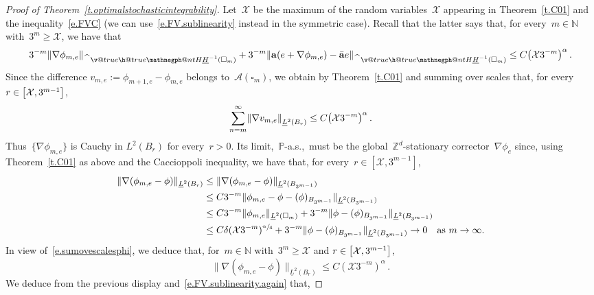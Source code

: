 \documentclass[11pt]{article} %
\makeatletter
\let\oldsquare\square %
\renewcommand{\square}{\oldsquare}
\numberwithin{equation}{section}
\theoremstyle{definition}
\let\originalleft\left
\let\originalright\right
\renewcommand{\left}{\mathopen{}\mathclose\bgroup\originalleft}
\renewcommand{\right}{\aftergroup\egroup\originalright}
\newcommand*{\N}{\ensuremath{\mathbb{N}}}
\newcommand*{\Zd}{\ensuremath{\mathbb{Z}^d}}
\renewcommand*{\hat}{\widehat}
\renewcommand{\a}{\mathbf{a}}
\newcommand{\ahom}{\bar{\a}}
\newcommand{\cu}{\square}
\renewcommand{\P}{\mathbb{P}}
\newcommand{\X}{\mathcal{X}}
\newcommand{\negphantom}{\v@true\h@true\negph@nt}
\newcommand{\negph@nt}{\ifmmode\expandafter\mathpalette 
  \expandafter\mathnegph@nt\else\expandafter\makenegph@nt\fi}
\newcommand{\makenegph@nt}[1]{%
  \setbox\z@\hbox{\color@begingroup#1\color@endgroup}\finnegph@nt}
\newcommand{\finnegph@nt}{%
  \setbox\tw@\null 
  \ifv@ \ht\tw@\ht\z@\dp\tw@\dp\z@\fi \ifh@\wd\tw@-\wd\z@\fi\box\tw@}
\newcommand{\mathnegph@nt}[2]{%
  \setbox\z@\hbox{$\m@th #1{#2}$}\finnegph@nt}
\newcommand{\Hminusul}{\hat{\phantom{H}}\negphantom{H}\underline{H}^{-1}}
\newcommand{\A}{\mathcal{A}}
\makeatother
\begin{document}
\begin{proof}[Proof of Theorem~\ref{t.optimalstochasticintegrability}]
Let~$\X$ be the maximum of the random variables~$\X$ appearing in Theorem~\ref{t.C01} and the inequality~\eqref{e.FVC} (we can use~\eqref{e.FV.sublinearity} instead in the symmetric case). 
Recall that the latter says that, for every~$m\in\N$ with~$3^m\geq \X$, we have that 
\begin{equation}
\label{e.FV.sublinearity.again}
3^{-m} \| \nabla \phi_{m,e} \|_{\Hminusul(\cu_m)} 
+
3^{-m} \| \a (e+ \nabla \phi_{m,e}) -\ahom e  \|_{\Hminusul(\cu_m)} 
\leq 
C  \bigl( \X 3^{-m} \bigr)^{\alpha}
\,.
\end{equation}
Since the difference $v_{m,e} := \phi_{m+1,e}-\phi_{m,e}$ belongs to~$\A(\cu_m)$, we obtain by Theorem~\ref{t.C01} and summing over scales that, for every $r \in \left[\X , 3^{m-1} \right]$, 
\begin{equation}
\label{e.sumovescalesphi}
\sum_{n = m}^\infty \left\| \nabla v_{m,e} \right\|_{\underline{L}^2(B_{r})} 
\leq
C \bigl( \X 3^{-m} \bigr)^{\alpha}
\,.
\end{equation}
Thus~$\{ \nabla \phi_{m,e}\}$ is Cauchy in $L^2(B_r)$ for every~$r>0$. Its limit,~$\P$-a.s.,~must be the global~$\Zd$-stationary corrector~$\nabla \phi_e$ since, using Theorem~\ref{t.C01} as above and the Caccioppoli inequality, we have that, for every~$r \in [\X , 3^{m-1}]$, 
\begin{align*}
\| \nabla ( \phi_{m,e} - \phi) \|_{\underline{L}^2(B_r)} 
& 
\leq 
\| \nabla ( \phi_{m,e} - \phi) \|_{\underline{L}^2(B_{3^{m-1}})} 
\\ &
\leq 
C 3^{-m} \| \phi_{m,e} - \phi - (\phi)_{B_{3^{m-1}}} \|_{\underline{L}^2(B_{3^{m-1}})} 
\\ & 
\leq 
C 3^{-m} \| \phi_{m,e} \|_{\underline{L}^2(\cu_m)} 
+
 3^{-m}\| \phi - (\phi)_{B_{3^{m-1}}} \|_{\underline{L}^2(B_{3^{m-1}})} 
\\ & 
\leq 
C \delta(\X 3^{-m})^{\sfrac \alpha4} + 3^{-m}\| \phi - (\phi)_{B_{3^{m-1}}} \|_{\underline{L}^2(B_{3^{m-1}})} 
\rightarrow 0 \quad \mbox{as} \ m \to \infty. 
\end{align*}
In view of~\eqref{e.sumovescalesphi}, we deduce that, for~$m\in\N$ with~$3^m\geq \X$ and $r \in \left[\X , 3^{m-1} \right]$,
\begin{equation*}
\| \nabla ( \phi_{m,e} - \phi) \|_{\underline{L}^2(B_r)} 
\leq
C ( \X 3^{-m} )^{\alpha}\,.
\end{equation*}
We deduce from the previous display and~\eqref{e.FV.sublinearity.again} that,

\end{proof}
\end{document}
